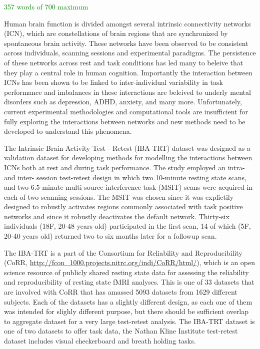 \documentclass[english,11pt]{article}
\begin{document}
\textcolor{green}{357 words of 700 maximum}

Human brain function is divided amongst several intrinsic connectivity networks (ICN), which are constellations of brain regions that are synchronized by spontaneous brain activity. These networks have been observed to be consistent across individuals, scanning sessions and experimental paradigms. The persistence of these networks across rest and task conditions has led many to beleive that they play a central role in human cognition. Importantly the interaction between ICNs has been shown to be linked to inter-individual variability in task performance and imbalances in these interactions are beleived to underly mental disorders such as depression, ADHD, anxiety, and many more. Unfortunately, current experimental methodologies and computational tools are insufficient for fully exploring the interactions between networks and new methods need to be developed to understand this phenomena. 

The Intrinsic Brain Activity Test - Retest (IBA-TRT) dataset was designed as a validation dataset for developing methods for modelling the interactions between ICNs both at rest and during task performance. The study employed an intra- and inter- session test-retest design in which two 10-minute resting state scans, and two 6.5-minute multi-source interference task (MSIT) \cite{bush} scans were acquired in each of two scanning sessions. The MSIT was chosen since it was explictily designed to robustly activates regions commonly associated with task positive networks and since it robustly deactivates the default network. Thirty-six individuals (18F, 20-48 years old) participated in the first scan, 14 of which (5F, 20-40 years old) returned two to six months later for a followup scan. 

The IBA-TRT is a part of the Consortium for Reliability and Reproducibility (CoRR, \url{http://fcon_1000.projects.nitrc.org/indi/CoRR/html/}), which is an open science resource of publicly shared resting state data for assessing the reliability and reproducibility of resting state fMRI analyses. This is one of 33 datasets that are involved with CoRR that has amassed 5093 datasets from 1629 different subjects. Each of the datasets has a slightly different design, as each one of them was intended for slighly different purpose, but there should be sufficient overlap to aggregate dataset for a very large test-retest analysis. The IBA-TRT dataset is one of two datasets to offer task data, the Nathan Kline Institute test-retest dataset includes visual checkerboard and breath holding tasks. 
\end{document}
